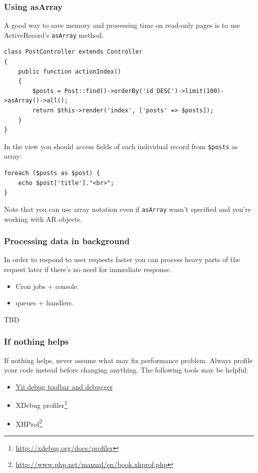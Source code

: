\subsubsection{Using asArray}
A good way to save memory and processing time on read-only pages is to use
ActiveRecord's \lstinline|asArray| method.

\lstset{language=php}\begin{lstlisting}
class PostController extends Controller
{
    public function actionIndex()
    {
        $posts = Post::find()->orderBy('id DESC')->limit(100)->asArray()->all();
        return $this->render('index', ['posts' => $posts]);
    }
}
\end{lstlisting}
In the view you should access fields of each individual record from \lstinline|$posts| as array:

\lstset{language=php}\begin{lstlisting}
foreach ($posts as $post) {
    echo $post['title']."<br>";
}
\end{lstlisting}
Note that you can use array notation even if \lstinline|asArray| wasn't specified and you're
working with AR objects.

\subsubsection{Processing data in background}
In order to respond to user requests faster you can process heavy parts of the
request later if there's no need for immediate response.

\begin{itemize}
\item Cron jobs + console.
\item queues + handlers.
\end{itemize}
TBD

\subsubsection{If nothing helps}
If nothing helps, never assume what may fix performance problem. Always profile your code instead before changing
anything. The following tools may be helpful:

\begin{itemize}
\item \hyperref[module-debug.md]{Yii debug toolbar and debugger}
\item XDebug profiler\footnote{\url{http://xdebug.org/docs/profiler}}
\item XHProf\footnote{\url{http://www.php.net/manual/en/book.xhprof.php}}
\end{itemize}


